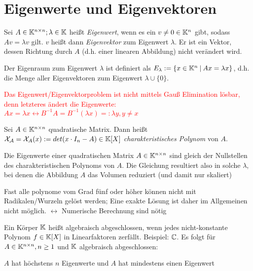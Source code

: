 \section{Eigenwerte und Eigenvektoren}
\begin{definition}	
	Sei $A \in \mathbb{K}^{n \times n}; \lambda \in \mathbb{K} $ heißt \emph{Eigenwert}, wenn es ein $v \neq 0 \in \mathbb{K}^n$ gibt, sodass $Av = \lambda v$ gilt. $v$ heißt dann \emph{Eigenvektor} zum Eigenwert $\lambda$. Er ist ein Vektor, dessen Richtung durch $A$ (d.h. einer linearen Abbildung) nicht verändert wird.

	Der Eigenraum zum Eigenwert $\lambda$ ist definiert als $E_\lambda := \{x \in \mathbb{K}^n \medspace | \medspace Ax = \lambda x \}$, d.h. die Menge aller Eigenvektoren zum Eigenwert $\lambda \cup \{0\}$. 
	
	\textcolor{red}{Das Eigenwert/Eigenvektorproblem ist nicht mittels Gauß Elimination lösbar, denn letzteres ändert die Eigenwerte: $Ax = \lambda x \leftrightarrow B^{-1}A = B^{-1}(\lambda x) =: \lambda y, y \neq x$}
\end{definition}

\begin{satz}
	Sei $A \in \mathbb{K}^{n \times n}$ quadratische Matrix. Dann heißt $\mathcal{X_A} = \mathcal{X}_A(x) := det(x \cdot I_n -A) \in \mathbb{K}[X]$ \emph{charakteristisches Polynom} von $A$.

	Die Eigenwerte einer quadratischen Matrix $A \in \mathbb{K}^{n \times n}$ sind gleich der Nullstellen des charakteristischen Polynoms von $A$. Die Gleichung resultiert also in solche $\lambda$, bei denen die Abbildung $A$ das Volumen reduziert (und damit nur skaliert)
\end{satz}

\begin{satz}
	Fast alle polynome vom Grad fünf oder höher können nicht mit Radikalen/Wurzeln gelöst werden; Eine exakte Lösung ist daher im Allgemeinen nicht möglich. 
	$\leftrightarrow$ Numerische Berechnung sind nötig
\end{satz}

\begin{definition}
	Ein Körper $\mathbb{K}$ heißt algebraisch abgeschlossen, wenn jedes nicht-konstante Polynom $f \in \mathbb{K}[X]$ in Linearfaktoren zerfällt. Beispiel: $\mathbb{C}$. Es folgt für $A \in \mathbb{K}^{n \times n}, n \geq 1$ und $\mathbb{K}$ algebraisch abgeschlossen:
	\begin{description}[noitemsep]
		\item $A$ hat höchstens $n$ Eigenwerte und $A$ hat mindestens einen Eigenwert
	\end{description}
\end{definition}

